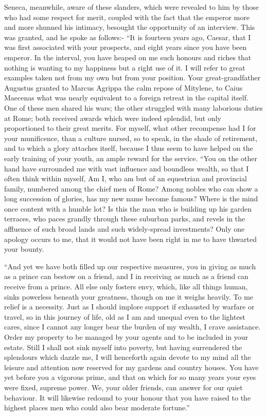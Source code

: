
Seneca, meanwhile, aware of these slanders, which were revealed to him by those who had some respect for merit, coupled with the fact that the emperor more and more shunned his intimacy, besought the opportunity of an interview. This was granted, and he spoke as follows:- ``It is fourteen years ago, Caesar, that I was first associated with your prospects, and eight years since you have been emperor. In the interval, you have heaped on me such honours and riches that nothing is wanting to my happiness but a right use of it. I will refer to great examples taken not from my own but from your position. Your great-grandfather Augustus granted to Marcus Agrippa the calm repose of Mitylene, to Caius Maecenas what was nearly equivalent to a foreign retreat in the capital itself. One of these men shared his wars; the other struggled with many laborious duties at Rome; both received awards which were indeed splendid, but only proportioned to their great merits. For myself, what other recompense had I for your munificence, than a culture nursed, so to speak, in the shade of retirement, and to which a glory attaches itself, because I thus seem to have helped on the early training of your youth, an ample reward for the service. ``You on the other hand have surrounded me with vast influence and boundless wealth, so that I often think within myself, Am I, who am but of an equestrian and provincial family, numbered among the chief men of Rome? Among nobles who can show a long succession of glories, has my new name become famous? Where is the mind once content with a humble lot? Is this the man who is building up his garden terraces, who paces grandly through these suburban parks, and revels in the affluence of such broad lands and such widely-spread investments? Only one apology occurs to me, that it would not have been right in me to have thwarted your bounty.


``And yet we have both filled up our respective measures, you in giving as much as a prince can bestow on a friend, and I in receiving as much as a friend can receive from a prince. All else only fosters envy, which, like all things human, sinks powerless beneath your greatness, though on me it weighs heavily. To me relief is a necessity. Just as I should implore support if exhausted by warfare or travel, so in this journey of life, old as I am and unequal even to the lightest cares, since I cannot any longer bear the burden of my wealth, I crave assistance. Order my property to be managed by your agents and to be included in your estate. Still I shall not sink myself into poverty, but having surrendered the splendours which dazzle me, I will henceforth again devote to my mind all the leisure and attention now reserved for my gardens and country houses. You have yet before you a vigorous prime, and that on which for so many years your eyes were fixed, supreme power. We, your older friends, can answer for our quiet behaviour. It will likewise redound to your honour that you have raised to the highest places men who could also bear moderate fortune.''

